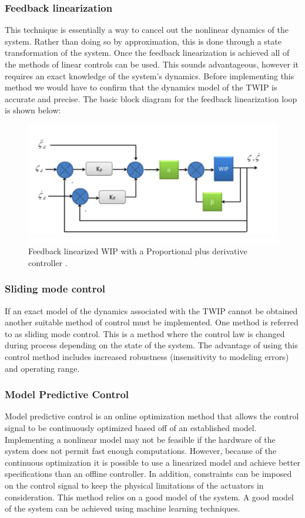 \documentclass[a4paper,12pt]{article}
\begin{document}
\subsubsection{Feedback linearization\cite{yang}}
This technique is essentially a way to cancel out the nonlinear dynamics of the system. Rather than doing so by approximation, this is done through a state transformation of the system. Once the feedback linearization is achieved all of the methods of linear controls can be used. This sounds advantageous, however it requires an exact knowledge of the system’s dynamics. Before implementing this method we would have to confirm that the dynamics model of the TWIP is accurate and precise. The basic block diagram for the feedback linearization loop is shown below: 
 \begin{figure}[H]
\includegraphics[width = \textwidth]{images/PDS_LinearFeedback.png}
\caption{Feedback linearized WIP with a Proportional plus derivative controller \cite{yang}.}
	\end{figure}
\subsubsection{Sliding mode control \cite{edwards}}
If an exact model of the dynamics associated with the TWIP cannot be obtained another suitable method of control must be implemented. One method is referred to as sliding mode control. This is a method where the control law is changed during process depending on the state of the system. The advantage of using this control method includes increased robustness (insensitivity to modeling errors) and operating range.
\subsubsection{Model Predictive Control \cite{brunton}}
Model predictive control is an online optimization method that allows the control signal to be continuously optimized based off of an established model. Implementing a nonlinear model may not be feasible if the hardware of the system does not permit fast enough computations. However, because of the continuous optimization it is possible to use a linearized model and achieve better specifications than an offline controller. In addition, constraints can be imposed on the control signal to keep the physical limitations of the actuators in consideration. This method relies on a good model of the system. A good model of the system can be achieved using machine learning techniques.
\end{document}

